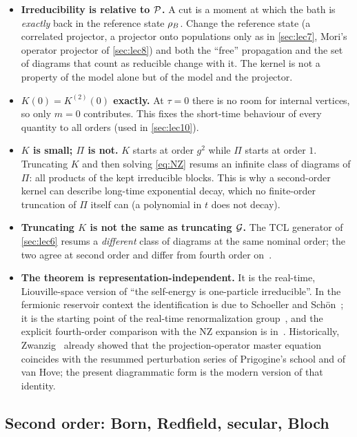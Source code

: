 \begin{itemize}[itemsep=2pt]
\item \textbf{Irreducibility is relative to $\mathcal{P}$.}
  A cut is a moment at which the bath is \emph{exactly} back in the reference state $\rho_{B}$.
  Change the reference state (a correlated projector, a projector onto populations only as in \cref{sec:lec7}, Mori's operator projector of \cref{sec:lec8}) and both the ``free'' propagation and the set of diagrams that count as reducible change with it.
  The kernel is not a property of the model alone but of the model and the projector.
\item \textbf{$K(0)=K^{(2)}(0)$ exactly.}
  At $\tau=0$ there is no room for internal vertices, so only $m=0$ contributes.
  This fixes the short-time behaviour of every quantity to all orders (used in \cref{sec:lec10}).
\item \textbf{$K$ is small; $\Pi$ is not.}
  $K$ starts at order $g^2$ while $\Pi$ starts at order $1$.
  Truncating $K$ and then solving \cref{eq:NZ} resums an infinite class of diagrams of $\Pi$: all products of the kept irreducible blocks.
  This is why a second-order kernel can describe long-time exponential decay, which no finite-order truncation of $\Pi$ itself can (a polynomial in $t$ does not decay).
\item \textbf{Truncating $K$ is not the same as truncating $\mathcal{G}$.}
  The TCL generator of \cref{sec:lec6} resums a \emph{different} class of diagrams at the same nominal order; the two agree at second order and differ from fourth order on~\cite{Timm2008,LeijnseWegewijs2008}.
\item \textbf{The theorem is representation-independent.}
  It is the real-time, Liouville-space version of ``the self-energy is one-particle irreducible''.
  In the fermionic reservoir context the identification is due to Schoeller and Sch\"on~\cite{SchoellerSchon1994,Schoeller2000}; it is the starting point of the real-time renormalization group~\cite{Schoeller2009,Keil2001}, and the explicit fourth-order comparison with the NZ expansion is in~\cite{LeijnseWegewijs2008,Timm2008}.
  Historically, Zwanzig~\cite{Zwanzig1964} already showed that the projection-operator master equation coincides with the resummed perturbation series of Prigogine's school and of van Hove; the present diagrammatic form is the modern version of that identity.
\end{itemize}

\subsection{Second order: Born, Redfield, secular, Bloch}
\label{sec:born}

